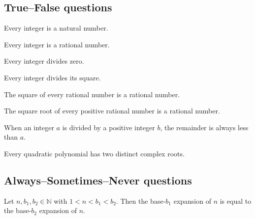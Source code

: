 \subsection*{True--False questions}


\begin{chapex} %
\label{cqGettingStartedTFBegin}
Every integer is a natural number.
\end{chapex}

\begin{chapex} %
Every integer is a rational number.
\end{chapex}

\begin{chapex} %
Every integer divides zero.
\end{chapex}

\begin{chapex} %
Every integer divides its square.
\end{chapex}

\begin{chapex} %
The square of every rational number is a rational number.
\end{chapex}

\begin{chapex} %
The square root of every positive rational number is a rational number.
\end{chapex}

\begin{chapex} %
When an integer $a$ is divided by a positive integer $b$, the remainder is always less than $a$.
\end{chapex}

\begin{chapex} %
\label{cqGettingStartedTFEnd}
Every quadratic polynomial has two distinct complex roots.
\end{chapex}

\subsection*{Always--Sometimes--Never questions}


\begin{chapex} %
\label{cqGettingStartedASNBegin}
Let $n,b_1,b_2 \in \mathbb{N}$ with $1 < n < b_1 < b_2$. Then the base-$b_1$ expansion of $n$ is equal to the base-$b_2$ expansion of $n$.
\end{chapex}

